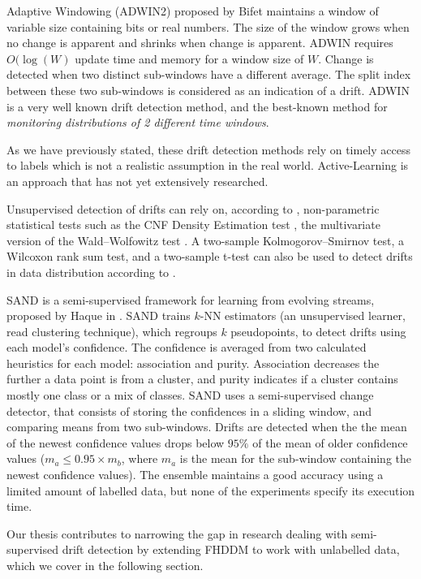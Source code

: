 Adaptive Windowing (ADWIN2) proposed by Bifet \cite{bifet2007learning} maintains a window of variable size containing bits or real numbers. The size of the window grows when no change is apparent and shrinks when change is apparent. ADWIN requires $O(\log(W)$ update time and memory for a window size of $W$. Change is detected when two distinct sub-windows have a different average. The split index between these two sub-windows is considered as an indication of a drift. ADWIN is a very well known drift detection method, and the best-known method for \textit{monitoring distributions of 2 different time windows}.

As we have previously stated, these drift detection methods rely on timely access to labels which is not a realistic assumption in the real world.  Active-Learning is an approach that has not yet extensively researched.

Unsupervised detection of drifts can rely on, according to \cite{sobolewski2013concept}, non-parametric statistical tests such as the CNF Density Estimation test \cite{dries2009adaptive}, the multivariate version of the Wald–Wolfowitz test \cite{friedman1979multivariate}.
A two-sample Kolmogorov–Smirnov test, a Wilcoxon rank sum test, and a two-sample t-test can also be used to detect drifts in data distribution according to \cite{sheskin2003handbook, sobolewski2013concept}.

\label{paragraph:SAND}SAND is a semi-supervised framework for learning from evolving streams, proposed by Haque in \cite{haque2015sand}. SAND trains $k$-NN estimators (an unsupervised learner, read clustering technique), which regroups $k$ pseudopoints, to detect drifts using each model's confidence. The confidence is averaged from two calculated heuristics for each model: association and purity. Association decreases the further a data point is from a cluster, and purity indicates if a cluster contains mostly one class or a mix of classes. SAND uses a semi-supervised change detector, that consists of storing the confidences in a sliding window, and comparing means from two sub-windows. Drifts are detected when the the mean of the newest confidence values drops below $95\%$ of the mean of older confidence values ($m_a \leq 0.95\times m_b$, where $m_a$ is the mean for the sub-window containing the newest confidence values). The ensemble maintains a good accuracy using a limited amount of labelled data, but none of the experiments specify its execution time.

Our thesis contributes to narrowing the gap in research dealing with semi-supervised drift detection by extending FHDDM to work with unlabelled data, which we cover in the following section.

